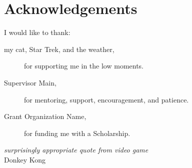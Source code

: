 \newpage
{}

\section*{\large Acknowledgements}
\noindent I would like to thank:
\begin{description}
\item[my cat, Star Trek, and the weather,]
	for supporting me in the low moments.
\item[Supervisor Main,]
	for  mentoring, support, encouragement, and patience.
\item[Grant Organization Name,]
	for funding me with a Scholarship.
\end{description}

\begin{flushright}
\textit{surprisingly appropriate quote from video game}
\\
Donkey Kong \\
\end{flushright}
